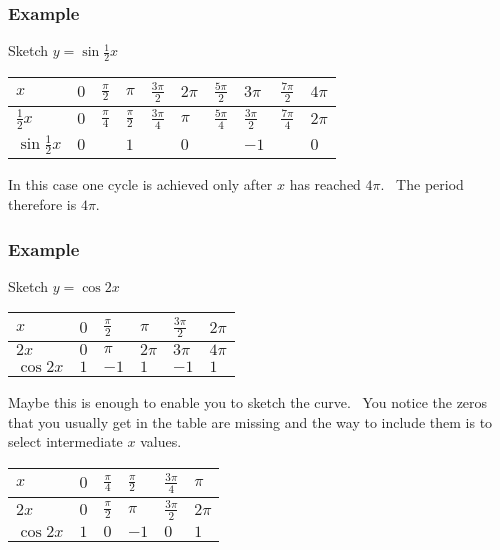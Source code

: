\subsubsection{Example}
Sketch $y =\sin  \frac{1}{2} x$ 


\begin{tabular}[c]{|l|l|l|l|l|l|l|l|l|l|}\hline
$x$  & $0$  & $\frac{\pi }{2}$  & $\pi $  & $\frac{3 \pi }{2}$  & $2 \pi $  & $\frac{5 \pi }{2}$  & $3 \pi $  & $\frac{7 \pi }{2}$  & $4 \pi $  \\
\hline
$\frac{1}{2} x$  & $0$  & $\frac{\pi }{4}$  & $\frac{\pi }{2}$  & $\frac{3 \pi }{4}$  & $\pi $  & $\frac{5 \pi }{4}$  & $\frac{3 \pi }{2}$  & $\frac{7 \pi }{4}$  & $2 \pi $  \\
\hline
$\sin  \frac{1}{2} x$  & $0$  &  & $1$  &  & $0$  &  & $ -1$  &  & $0$  \\
\hline
\end{tabular}

In this case one cycle is achieved only after $x$ has reached $4 \pi $. \ The period therefore is $4 \pi $. 

   
\setlength\fboxrule{0.01in}\setlength\fboxsep{0.2in}


\subsubsection{Example}
Sketch $y =\cos  2 x$ 


\begin{tabular}[c]{|l|l|l|l|l|l|}\hline
$x$  & $0$  & $\frac{\pi }{2}$  & $\pi $  & $\frac{3 \pi }{2}$  & $2 \pi $  \\
\hline
$2 x$  & $0$  & $\pi $  & $2 \pi $  & $3 \pi $  & $4 \pi $  \\
\hline
$\cos  2 x$  & $1$  & $ -1$  & $1$  & $ -1$  & $1$  \\
\hline
\end{tabular}

Maybe this is enough to enable you to sketch the curve. \ You notice the zeros that you usually get
in the table are missing and the way to include them is to select intermediate $x$ values. 


\begin{tabular}[c]{|l|l|l|l|l|l|}\hline
$x$  & $0$  & $\frac{\pi }{4}$  & $\frac{\pi }{2}$  & $\frac{3 \pi }{4}$  & $\pi $  \\
\hline
$2 x$  & $0$  & $\frac{\pi }{2}$  & $\pi $  & $\frac{3 \pi }{2}$  & $2 \pi $  \\
\hline
$\cos  2 x$  & $1$  & $0$  & $ -1$  & $0$  & $1$  \\
\hline
\end{tabular}


